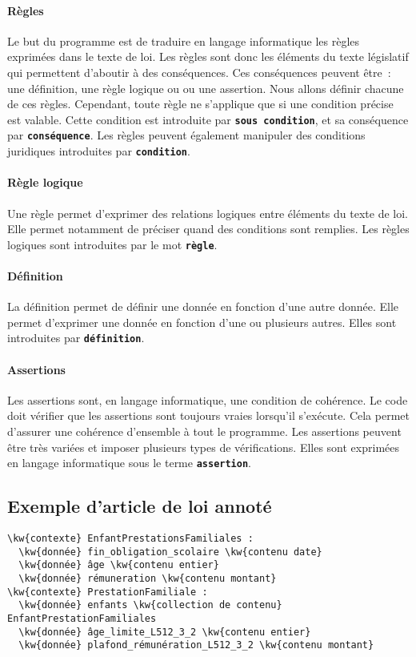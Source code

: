 \documentclass[12pt, french]{article}
\newcommand{\kw}[1]{\textbf{\textcolor{OliveGreen}{#1}}}
\newcommand{\inlinekw}[1]{\kw{\texttt{#1}}}
\newenvironment{metadata}{
  \begin{tcolorbox}[colframe=OliveGreen, title=\textcolor{black}{\texttt{Métadonnées}}, before skip=1em, after skip=1em]
}{
\end{tcolorbox}
}
\begin{document}
\paragraph{Règles} Le but du programme est de traduire en langage informatique les règles exprimées dans le texte de loi. Les règles sont donc les éléments du texte législatif qui permettent d’aboutir à des conséquences. Ces conséquences peuvent être : une définition, une règle logique ou  ou une assertion. Nous allons définir chacune de ces règles. Cependant, toute règle ne s’applique que si une condition précise est valable. Cette condition est introduite par \inlinekw{sous condition}, et sa conséquence par \inlinekw{conséquence}. Les règles peuvent également manipuler des conditions juridiques introduites par \inlinekw{condition}.

\paragraph{Règle logique} Une règle permet d’exprimer des relations logiques entre éléments du texte de loi. Elle permet notamment de préciser quand des conditions sont remplies. Les règles logiques sont introduites par le mot \inlinekw{règle}.

\paragraph{Définition} La définition permet de définir une donnée en fonction d’une autre donnée. Elle permet d’exprimer une donnée en fonction d’une ou plusieurs autres. Elles sont introduites par \inlinekw{définition}.

\paragraph{Assertions} Les assertions sont, en langage informatique, une condition de cohérence. Le code doit vérifier que les assertions sont toujours vraies lorsqu’il s’exécute. Cela permet d’assurer une cohérence d’ensemble à tout le programme. Les assertions peuvent être très variées et imposer plusieurs types de vérifications. Elles sont exprimées en langage informatique sous le terme \inlinekw{assertion}.

\subsection{Exemple d'article de loi annoté}

\begin{metadata}
\begin{Verbatim}[commandchars=\\\{\}]
\kw{contexte} EnfantPrestationsFamiliales :
  \kw{donnée} fin_obligation_scolaire \kw{contenu date}
  \kw{donnée} âge \kw{contenu entier}
  \kw{donnée} rémuneration \kw{contenu montant}
\kw{contexte} PrestationFamiliale :
  \kw{donnée} enfants \kw{collection de contenu} EnfantPrestationFamiliales
  \kw{donnée} âge_limite_L512_3_2 \kw{contenu entier}
  \kw{donnée} plafond_rémunération_L512_3_2 \kw{contenu montant}
\end{Verbatim}
\end{metadata}
\end{document}
